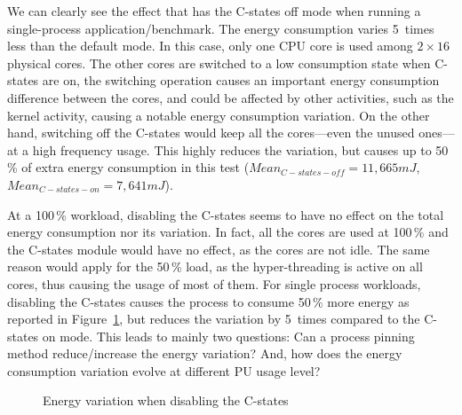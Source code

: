 We can clearly see the effect that has the \textsf{C-states off} mode when running a single-process application/benchmark.
The energy consumption varies 5~times less than the default mode.
In this case, only one CPU core is used among $2\times16$ physical cores.
The other cores are switched to a low consumption state when C-states are on, the switching operation causes an important energy consumption difference between the cores, and could be affected by other activities, such as the kernel activity, causing a notable energy consumption variation.
On the other hand, switching off the C-states would keep all the cores---even the unused ones---at a high frequency usage.
This highly reduces the variation, but causes up to 50\,\% of extra energy consumption in this test ($Mean_{C-states-off}=11,665 mJ$,$Mean_{C-states-on}=7,641 mJ$).

At a 100\,\% workload, disabling the C-states seems to have no effect on the total energy consumption nor its variation.
In fact, all the cores are used at 100\,\% and the C-states module would have no effect, as the cores are not idle.
The same reason would apply for the 50\,\% load, as the hyper-threading is active on all cores, thus causing the usage of most of them.
For single process workloads, disabling the C-states causes the process to consume 50\,\% more energy as reported in Figure~\ref{fig:c-states}, but reduces the variation by 5~times compared to the \textsf{C-states on} mode.
This leads to mainly two questions: Can a process pinning method reduce/increase the energy variation? And, how does the energy consumption variation evolve at different PU usage level?

\begin{figure}
    \caption{Energy variation when disabling the C-states}\label{fig:c-states}
\end{figure}

